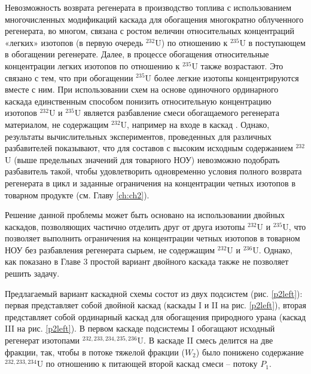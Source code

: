 Невозможность возврата регенерата в производство топлива с использованием многочисленных модификаций каскада для обогащения многократно облученного регенерата, во многом, связана с ростом величин относительных концентраций «легких» изотопов (в первую очередь $^{232}$U) по отношению к $^{235}$U в поступающем в обогащении регенерате. Далее, в процессе обогащения относительные концентрации легких изотопов по отношению к $^{235}$U также возрастают. Это связано с тем, что при обогащении $^{235}$U более легкие изотопы концентрируются вместе с ним. При использовании схем на основе одиночного ординарного каскада единственным способом понизить относительную концентрацию изотопов  $^{232}$U и $^{235}$U является разбавление смеси обогащаемого регенерата материалом, не содержащим $^{232}$U, например на входе в каскад \cite{smirnovKaskadnyeShemyZadachah2012}. Однако, результаты вычислительных экспериментов, проведенных для различных разбавителей показывают, что для составов с высоким исходным содержанием $^{232}$U (выше предельных значений для товарного НОУ) невозможно подобрать разбавитель такой, чтобы удовлетворить одновременно условия полного возврата регенерата в цикл и заданные ограничения на концентрации четных изотопов в товарном продукте (см. Главу \ref{ch:ch2}). 

Решение данной проблемы может быть основано на использовании двойных каскадов, позволяющих частично отделить друг от друга изотопы $^{232}$U и $^{235}$U, что позволяет выполнить ограничения на концентрации четных изотопов в товарном НОУ без разбавления регенерата сырьем, не содержащим $^{232}$U и $^{236}$U. Однако, как показано в Главе 3 простой вариант двойного каскада также не позволяет решить задачу. 

Предлагаемый вариант каскадной схемы состот из двух подсистем (рис. \ref{p2left}): первая представляет собой двойной каскад (каскады I и II на рис. \ref{p2left}), вторая представляет собой ординарный каскад для обогащения природного урана (каскад III на рис. \ref{p2left}). В первом каскаде подсистемы I обогащают исходный регенерат изотопами $^{232,233,234,235,236}$U. В каскаде II смесь делится на две фракции, так, чтобы в потоке тяжелой фракции ($W_2$) было понижено содержание $^{232,233,234}$U по отношению к питающей второй каскад смеси -- потоку $P_1$. 

